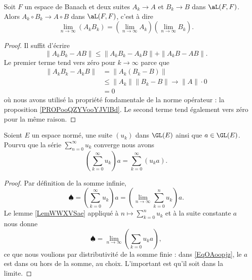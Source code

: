 \begin{lemma}   \label{LemWWXVSae}
Soit \( F\) un espace de Banach et deux suites \( A_k\to A\) et \( B_k\to B\) dans \( \aL(F,F)\). Alors \( A_k\circ B_k\to A\circ B\) dans \( \aL(F,F)\), c'est à dire
\begin{equation}
    \lim_{n\to \infty} (A_kB_k)=\left( \lim_{n\to \infty} A_k \right)\left( \lim_{n\to \infty} B_k \right).
\end{equation}
\end{lemma}

\begin{proof}
    Il suffit d'écrire
    \begin{equation}
        \| A_kB_k-AB \|\leq \| A_kB_k-A_kB \|+\| A_kB-AB \|.
    \end{equation}
    Le premier terme tend vers zéro pour \( k\to\infty\) parce que 
    \begin{subequations}
        \begin{align}
            \| A_kB_k-A_kB \|&=\| A_k(B_k-B) \|\\
            &\leq \| A_k \|\| B_k-B \|\to \| A \|\cdot 0\\
            &=0
        \end{align}
    \end{subequations}
    où nous avons utilisé la propriété fondamentale de la norme opérateur : la proposition \ref{PROPooQZYVooYJVlBd}. Le second terme tend également vers zéro pour la même raison.
\end{proof}

\begin{proposition} \label{PropQXqEPuG}
    Soient \( E\) un espace normé, une suite \( (u_k)\) dans \( \GL(E)\) ainsi que \( a\in\GL(E)\). Pourvu que la série \( \sum_{n=0}^{\infty}u_k\) converge nous avons
    \begin{equation}
        \left( \sum_{k=0}^{\infty}u_k \right)a=\sum_{k=0}^{\infty}(u_ka).
    \end{equation}
\end{proposition}

\begin{proof}
    Par définition de la somme infinie,
    \begin{equation}
        \spadesuit=\left( \sum_{k=0}^{\infty}u_k \right)a=\left( \lim_{n\to \infty} \sum_{k=0}^nu_k \right)a.
    \end{equation}
    Le lemme \ref{LemWWXVSae} appliqué à \( n\mapsto\sum_{k=0}^nu_k\) et à la suite constante \( a\) nous donne
    \begin{equation}    \label{EqOAoopjz}
        \spadesuit=\lim_{n\to \infty} \left( \sum_{k=0}u_ka \right),
    \end{equation}
    ce que nous voulions par distributivité de la somme finie : dans \eqref{EqOAoopjz}, le \( a\) est dans ou hors de la somme, au choix. L'important est qu'il soit dans la limite.
\end{proof}

